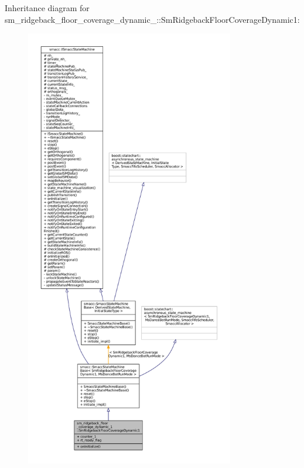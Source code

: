 Inheritance diagram for sm\+\_\+ridgeback\+\_\+floor\+\_\+coverage\+\_\+dynamic\+\_\+:\+:Sm\+Ridgeback\+Floor\+Coverage\+Dynamic1\+:
\nopagebreak
\begin{figure}[H]
\begin{center}
\leavevmode
\includegraphics[height=550pt]{structsm__ridgeback__floor__coverage__dynamic__1_1_1SmRidgebackFloorCoverageDynamic1__inherit__graph}
\end{center}
\end{figure}


